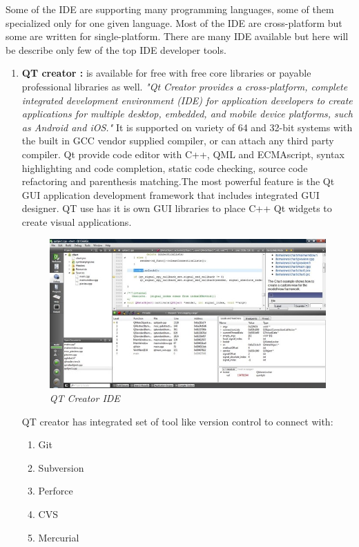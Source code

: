 \documentclass[12pt]{article}
\begin{document}
{Some of the IDE are supporting many programming languages, some of them specialized only for one given language. Most of the IDE are cross-platform but some are written for single-platform. There are many IDE available but here will be describe only few of the top IDE developer tools.\\
{\setlength{\parindent}{0cm}
\begin{enumerate}
\item \textbf{QT creator : }is available for free with free core libraries or payable professional libraries as well. \textit{"Qt Creator provides a cross-platform, complete integrated development environment (IDE) for application developers to create applications for multiple desktop, embedded, and mobile device platforms, such as Android and iOS."}\cite{QT} It is supported on variety of 64 and 32-bit systems with the built in GCC vendor supplied compiler, or can attach any third party compiler. Qt provide code editor with C++, QML and ECMAscript, syntax highlighting and code completion, static code checking, source code refactoring and parenthesis matching.The most powerful feature is the Qt GUI application development framework that includes integrated GUI designer. QT use has it is own GUI libraries to place C++ Qt widgets to create visual applications.\\

\begin{figure}[h!]
\centering
\includegraphics[scale=0.5]{Pictures/qtcreator.jpg}
\caption{\textit{\color{gray}QT Creator IDE \cite{opentube}}}
\end{figure}




QT creator has integrated set of tool like version control to connect with:
\begin{enumerate}
\item Git
\item Subversion
\item Perforce
\item CVS
\item Mercurial
\end{enumerate}


\end{enumerate}}}
\end{document}
